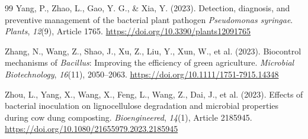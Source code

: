 \begin{thebibliography}{99}
 Yang, P., Zhao, L., Gao, Y. G., \& Xia, Y. (2023). Detection, diagnosis, and preventive management of the bacterial plant pathogen \textit{Pseudomonas syringae}. \textit{Plants}, \textit{12}(9), Article 1765. \url{https://doi.org/10.3390/plants12091765}

 Zhang, N., Wang, Z., Shao, J., Xu, Z., Liu, Y., Xun, W., et al. (2023). Biocontrol mechanisms of \textit{Bacillus}: Improving the efficiency of green agriculture. \textit{Microbial Biotechnology}, \textit{16}(11), 2050--2063. \url{https://doi.org/10.1111/1751-7915.14348}

 Zhou, L., Yang, X., Wang, X., Feng, L., Wang, Z., Dai, J., et al. (2023). Effects of bacterial inoculation on lignocellulose degradation and microbial properties during cow dung composting. \textit{Bioengineered}, \textit{14}(1), Article 2185945. \url{https://doi.org/10.1080/21655979.2023.2185945}

\end{thebibliography}
